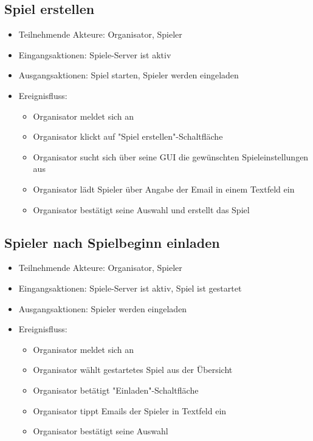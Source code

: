 \documentclass[a4paper]{scrreprt}
\begin{document}
    \subsection{Spiel erstellen}
    \begin{itemize}
        \item Teilnehmende Akteure: \Gls{Organisator}, \Gls{Spieler}
        \item Eingangsaktionen: Spiele-Server ist aktiv
        \item Ausgangsaktionen: Spiel starten, Spieler werden eingeladen
        \item Ereignisfluss:
        \begin{itemize}
            \item Organisator meldet sich an
            \item Organisator klickt auf "Spiel erstellen"-Schaltfläche
            \item Organisator sucht sich über seine GUI die gewünschten Spieleinstellungen aus
            \item Organisator lädt Spieler über Angabe der Email in einem Textfeld ein
            \item Organisator bestätigt seine Auswahl und erstellt das Spiel
        \end{itemize}
    \end{itemize}

    \subsection{Spieler nach Spielbeginn einladen}
    \begin{itemize}
        \item Teilnehmende Akteure: \Gls{Organisator}, \Gls{Spieler}
        \item Eingangsaktionen: Spiele-Server ist aktiv, Spiel ist gestartet
        \item Ausgangsaktionen: Spieler werden eingeladen
        \item Ereignisfluss:
        \begin{itemize}
            \item Organisator meldet sich an
            \item Organisator wählt gestartetes Spiel aus der Übersicht
            \item Organisator betätigt "Einladen"-Schaltfläche
            \item Organisator tippt Emails der Spieler in Textfeld ein
            \item Organisator bestätigt seine Auswahl
        \end{itemize}
    \end{itemize}
\end{document}
